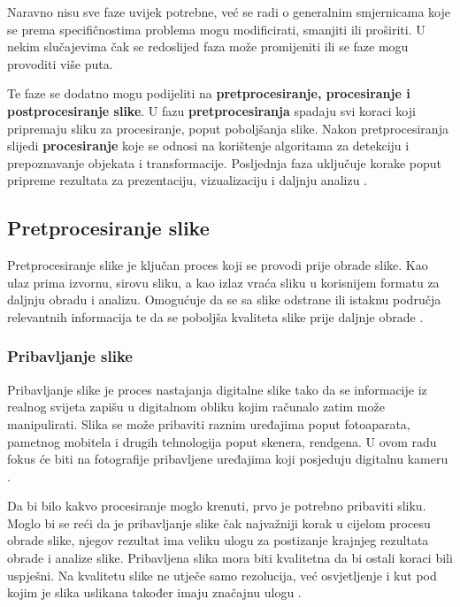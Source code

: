 \documentclass{foi}
\begin{document}
Naravno nisu sve faze uvijek potrebne, već se radi o generalnim smjernicama koje se prema specifičnostima problema mogu modificirati, smanjiti ili proširiti. U nekim slučajevima čak se redoslijed faza može promijeniti ili se faze mogu provoditi više puta.    

Te faze se dodatno mogu podijeliti na \textbf{pretprocesiranje, procesiranje i postprocesiranje slike}. U fazu \textbf{pretprocesiranja} spadaju svi koraci koji pripremaju sliku za procesiranje, poput poboljšanja slike. Nakon pretprocesiranja slijedi \textbf{procesiranje} koje se odnosi na korištenje algoritama za detekciju i prepoznavanje objekata i transformacije. Posljednja faza uključuje korake poput pripreme rezultata za prezentaciju, vizualizaciju i daljnju analizu \cite{IamgeProcesingPhases}.

\pagebreak
\subsection{Pretprocesiranje slike}

Pretprocesiranje slike je ključan proces koji se provodi prije obrade slike. Kao ulaz prima izvornu, sirovu sliku, a kao izlaz vraća sliku u korisnijem formatu za daljnju obradu i analizu. Omogućuje da se sa slike odstrane ili istaknu područja relevantnih informacija te da se poboljša kvaliteta slike prije daljnje obrade \cite{Patel2023Oct}.

\subsubsection{Pribavljanje slike}

Pribavljanje slike je proces nastajanja digitalne slike tako da se informacije iz realnog svijeta zapišu u digitalnom obliku kojim računalo zatim može manipulirati. Slika se može pribaviti raznim uređajima poput fotoaparata, pametnog mobitela i drugih tehnologija poput skenera, rendgena. U ovom radu fokus će biti na fotografije pribavljene uređajima koji posjeduju digitalnu kameru \cite{BibEntry2025Apr}.


Da bi bilo kakvo procesiranje moglo krenuti, prvo je potrebno pribaviti sliku. Moglo bi se reći da je pribavljanje slike čak najvažniji korak u cijelom procesu obrade slike, njegov rezultat ima veliku ulogu za postizanje krajnjeg rezultata obrade i analize slike. Pribavljena slika mora biti kvalitetna da bi ostali koraci bili uspješni. Na kvalitetu slike ne utječe samo rezolucija, već osvjetljenje i kut pod kojim je slika uslikana također imaju značajnu ulogu \cite{BibEntry2025Apr}.
\end{document}
